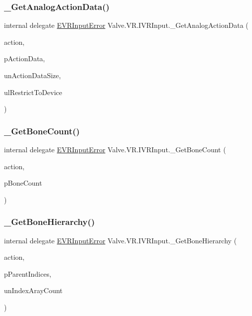 \subsubsection{\texorpdfstring{\_GetAnalogActionData()}{\_GetAnalogActionData()}}
{\footnotesize\ttfamily internal delegate \mbox{\hyperlink{namespace_valve_1_1_v_r_a592d7f4189b8346d6c96dbdbaa35bc1b}{E\+V\+R\+Input\+Error}} Valve.\+V\+R.\+I\+V\+R\+Input.\+\_\+\+Get\+Analog\+Action\+Data (\begin{DoxyParamCaption}\item[{ulong}]{action,  }\item[{ref \mbox{\hyperlink{struct_valve_1_1_v_r_1_1_input_analog_action_data__t}{Input\+Analog\+Action\+Data\+\_\+t}}}]{p\+Action\+Data,  }\item[{uint}]{un\+Action\+Data\+Size,  }\item[{ulong}]{ul\+Restrict\+To\+Device }\end{DoxyParamCaption})}

\mbox{\label{struct_valve_1_1_v_r_1_1_i_v_r_input_a45156426324aa529ba4317faa0ddbded}} 
\subsubsection{\texorpdfstring{\_GetBoneCount()}{\_GetBoneCount()}}
{\footnotesize\ttfamily internal delegate \mbox{\hyperlink{namespace_valve_1_1_v_r_a592d7f4189b8346d6c96dbdbaa35bc1b}{E\+V\+R\+Input\+Error}} Valve.\+V\+R.\+I\+V\+R\+Input.\+\_\+\+Get\+Bone\+Count (\begin{DoxyParamCaption}\item[{ulong}]{action,  }\item[{ref uint}]{p\+Bone\+Count }\end{DoxyParamCaption})}

\mbox{\label{struct_valve_1_1_v_r_1_1_i_v_r_input_a1e1830a194a220b6947473ecfb0966db}} 
\subsubsection{\texorpdfstring{\_GetBoneHierarchy()}{\_GetBoneHierarchy()}}
{\footnotesize\ttfamily internal delegate \mbox{\hyperlink{namespace_valve_1_1_v_r_a592d7f4189b8346d6c96dbdbaa35bc1b}{E\+V\+R\+Input\+Error}} Valve.\+V\+R.\+I\+V\+R\+Input.\+\_\+\+Get\+Bone\+Hierarchy (\begin{DoxyParamCaption}\item[{ulong}]{action,  }\item[{\mbox{[}\+In, Out\mbox{]} int \mbox{[}$\,$\mbox{]}}]{p\+Parent\+Indices,  }\item[{uint}]{un\+Index\+Aray\+Count }\end{DoxyParamCaption})}

